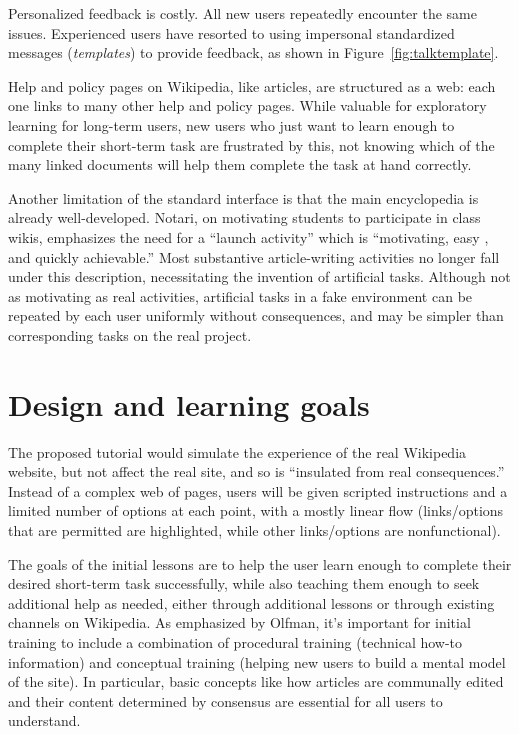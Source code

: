 \documentclass{acm_proc_article-sp}
\begin{document}
Personalized feedback is costly. All new users repeatedly encounter the same issues. Experienced users have resorted to using impersonal standardized messages (\emph{templates}) to provide feedback, as shown in Figure~\ref{fig:talktemplate}. 

Help and policy pages on Wikipedia, like articles, are structured as a web: each one links to many other help and policy pages. While valuable for exploratory learning for long-term users, new users who just want to learn enough to complete their short-term task are frustrated by this, not knowing which of the many linked documents will help them complete the task at hand correctly.

Another limitation of the standard interface is that the main encyclopedia is already well-developed. Notari,\cite{Notari:2006} on motivating students to participate in class wikis, emphasizes the need for a ``launch activity'' which is ``motivating, easy , and quickly achievable.'' Most substantive article-writing activities no longer fall under this description, necessitating the invention of artificial tasks. Although not as motivating as real activities, artificial tasks in a fake environment can be repeated by each user uniformly without consequences, and may be simpler than corresponding tasks on the real project.

\section{Design and learning goals}

The proposed tutorial would simulate the experience of the real Wikipedia website, but not affect the real site, and so is ``insulated from real consequences.'' \cite{Garris:2002} Instead of a complex web of pages, users will be given scripted instructions and a limited number of options at each point, with a mostly linear flow (links/options that are permitted are highlighted, while other links/options are nonfunctional).

The goals of the initial lessons are to help the user learn enough to complete their desired short-term task successfully, while also teaching them enough to seek additional help as needed, either through additional lessons or through existing channels on Wikipedia. As emphasized by Olfman,\cite{Olfman:1994} it's important for initial training to include a combination of procedural training (technical how-to information) and conceptual training (helping new users to build a mental model of the site). In particular, basic concepts like how articles are communally edited and their content determined by consensus are essential for all users to understand.
\end{document}
